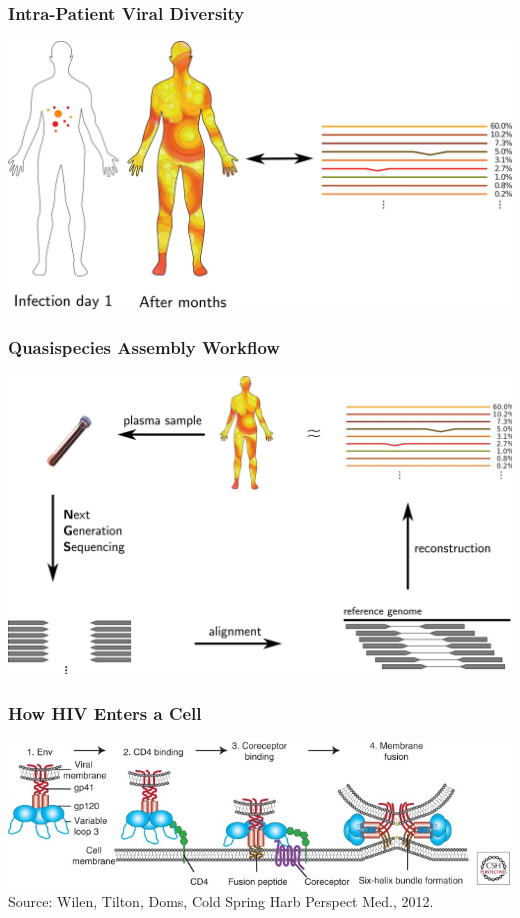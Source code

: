 \documentclass[notes=hide]{beamer}
\newcommand{\0}{\ensuremath{\mathtt{0}}}
\newcommand{\1}{\ensuremath{\mathtt{1}}}
\begin{document}
\begin{frame}
\frametitle{Intra-Patient Viral Diversity}
\begin{center}
\includegraphics[width=\textwidth]{figs/intra-patient-diversity}
\end{center}
\end{frame}

\begin{frame}
\frametitle{Quasispecies Assembly Workflow}
\begin{center}
\includegraphics[width=\textwidth]{figs/workflow-overview}
\end{center}
\end{frame}


\begin{frame}
\frametitle{How HIV Enters a Cell}
\begin{center}
\includegraphics[width=\textwidth]{figs/hiv-cell-entry}\\
{\tiny Source: Wilen, Tilton, Doms, Cold Spring Harb Perspect Med., 2012.}
\end{center}
\end{frame}
\end{document}
